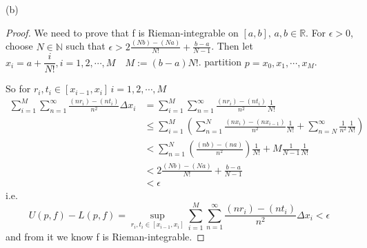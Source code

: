 \documentclass{article}
\begin{document}
(b)
\begin{proof}
    We need to prove that f is Rieman-integrable on  $ [a,b],\,a,b\in \mathbb{R} $. 
    For  $ \epsilon>0 $, choose  $ N\in\mathbb{N} $ such that  $ \epsilon>2\frac{(Nb)-(Na)}{N!}+\frac{b-a}{N-1} $.
    Then let  $ x_i=a+ \dfrac{i}{N!},i=1,2,\cdots,M\quad M:=(b-a)N!   $. partition  $ p={x_0,x_1,\cdots,x_M} $.

    So for  $ r_i,t_i\in [x_{i-1},x_i]\, i=1,2,\cdots,M $ 
    \begin{align*}
        \sum\limits_{i=1}^{M} \sum\limits_{n=1}^{\infty}  \frac{(nr_i)-(nt_i)}{n^2}\Delta x_i&=\sum\limits_{i=1}^{M} \sum\limits_{n=1}^{\infty}  \frac{(nr_i)-(nt_i)}{n^2} \frac{1}{N!}   \\
        &\leqslant \sum\limits_{i=1}^{M } (\sum\limits_{n=1}^{N}\frac{(nx_i)-(nx_{i-1})}{n^2} \frac{1}{N!}+\sum\limits_{n=N}^{\infty}\frac{1}{n^2}\frac{1}{N!}    )\\   
        &<\sum\limits_{n=1}^{N}(\frac{(nb)-(na)}{n^2})\frac{1}{N!}+M\frac{1}{N-1}\frac{1}{N!}\\
        &<2\frac{(Nb)-(Na)}{N!}+\frac{b-a}{N-1} \\
        &<\epsilon    
    \end{align*}   
    i.e.
    \[U(p,f)-L(p,f)=\sup\limits_{r_i,t_i\in[x_{i-1},x_i]}\sum\limits_{i=1}^{M} \sum\limits_{n=1}^{\infty}  \frac{(nr_i)-(nt_i)}{n^2}\Delta x_i<\epsilon\]
    and from it we know f is Rieman-integrable.
\end{proof}
\end{document}
